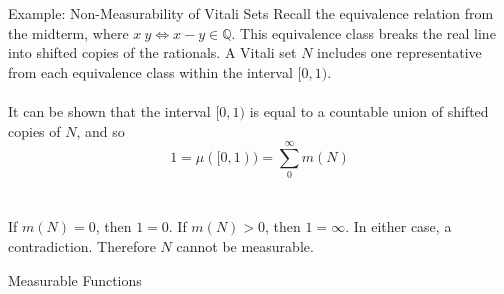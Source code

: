 \documentclass{beamer}
\begin{document}
\begin{frame}{Example: Non-Measurability of Vitali Sets}
Recall the equivalence relation from the midterm, where 
$x~y \iff x - y \in \mathbb{Q}$. This equivalence class
breaks the real line into shifted copies of the rationals.
A Vitali set $N$ includes one representative from each equivalence class within the interval
$[0,1)$.
\\~\\
It can be shown that the interval $[0,1)$ is equal to a countable
union of shifted copies of $N$, and so
\[
    1 = \mu([0,1)) = \sum_{0}^{\infty} m(N)
\]
\\~\\
If $m(N) = 0$, then $1=0$. If $m(N) > 0$, then $1=\infty$.
In either case, a contradiction. Therefore $N$ cannot be
measurable.

\end{frame}

\begin{frame}{Measurable Functions}
    
\end{frame}
\end{document}
